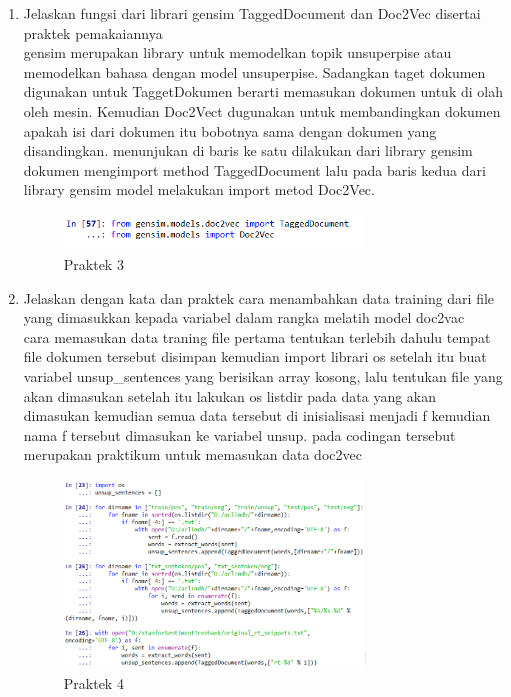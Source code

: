 \begin{enumerate}
\item Jelaskan fungsi dari librari gensim TaggedDocument dan Doc2Vec disertai praktek pemakaiannya
	\hfill\\
	gensim merupakan library untuk memodelkan topik unsuperpise atau memodelkan bahasa dengan model unsuperpise. Sadangkan taget dokumen digunakan untuk TaggetDokumen berarti memasukan dokumen untuk di olah oleh mesin. Kemudian Doc2Vect dugunakan untuk membandingkan dokumen apakah isi dari dokumen itu bobotnya sama dengan dokumen yang disandingkan. menunjukan di baris ke satu dilakukan dari library gensim dokumen mengimport method TaggedDocument lalu pada baris kedua dari library gensim model melakukan import metod Doc2Vec.
\begin{figure}[H]
    \includegraphics[width=8cm]{figures/1174084/5/15.png}
    \centering
    \caption{Praktek 3}
\end{figure}

\item Jelaskan dengan kata dan praktek cara menambahkan data training dari ﬁle yang dimasukkan kepada variabel dalam rangka melatih model doc2vac
	\hfill\\
	cara memasukan data traning file pertama tentukan terlebih dahulu tempat file dokumen tersebut disimpan kemudian import librari os setelah itu buat variabel unsup\_sentences yang berisikan array kosong, lalu tentukan file yang akan dimasukan setelah itu lakukan os listdir pada data yang akan dimasukan kemudian semua data tersebut di inisialisasi menjadi f kemudian nama f tersebut dimasukan ke variabel unsup. pada codingan tersebut merupakan praktikum untuk memasukan data doc2vec
\begin{figure}[H]
    \includegraphics[width=8cm]{figures/1174084/5/16.png}
    \centering
    \caption{Praktek 4}
\end{figure}


\end{enumerate}
